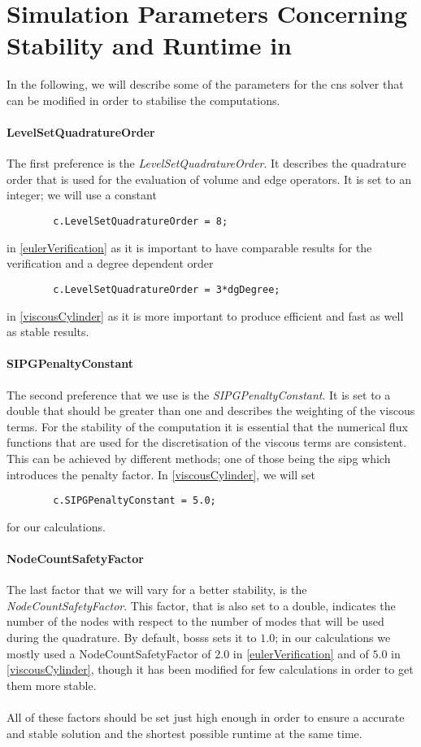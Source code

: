 	\section{Simulation Parameters Concerning Stability and Runtime in }
	\label{parameters}
	
	In the following, we will describe some of the parameters for the \gls{cns} solver that can be modified in order to stabilise the computations. 
	
	\paragraph{LevelSetQuadratureOrder}
	The first preference is the \textit{LevelSetQuadratureOrder}. It describes the quadrature order that is used for the evaluation of volume and edge operators. It is set to an integer; we will use a constant
	\begin{lstlisting}
		c.LevelSetQuadratureOrder = 8;
	\end{lstlisting}
	in \cref{eulerVerification} as it is important to have comparable results for the verification and a degree dependent order
	\begin{lstlisting}
		c.LevelSetQuadratureOrder = 3*dgDegree;
	\end{lstlisting}
	in \cref{viscousCylinder} as it is more important to produce efficient and fast as well as stable results. 
	
	\paragraph{SIPGPenaltyConstant}
	 The second preference that we use is the \textit{SIPGPenaltyConstant}. It is set to a double that should be greater than one and describes the weighting of the viscous terms. For the stability of the computation it is essential that the numerical flux functions that are used for the discretisation of the viscous terms are consistent. This can be achieved by different methods; one of those being the \gls{sipg} which introduces the penalty factor. In \cref{viscousCylinder}, we will set 
	 \begin{lstlisting}
		c.SIPGPenaltyConstant = 5.0;
	 \end{lstlisting}
	for our calculations.
		 
	\paragraph{NodeCountSafetyFactor}
	The last factor that we will vary for a better stability, is the \textit{NodeCountSafetyFactor}. This factor, that is also set to a double, indicates the number of the nodes with respect to the number of modes that will be used during the quadrature. By default, \gls{bosss} sets it to $1.0$; in our calculations we mostly used a NodeCountSafetyFactor of $2.0$  in \cref{eulerVerification} and of $5.0$ in \cref{viscousCylinder}, though it has been modified for few calculations in order to get them more stable.\\\\
	
     All of these factors should be set just high enough in order to ensure a accurate and stable solution and the shortest possible runtime at the same time. 
     

	